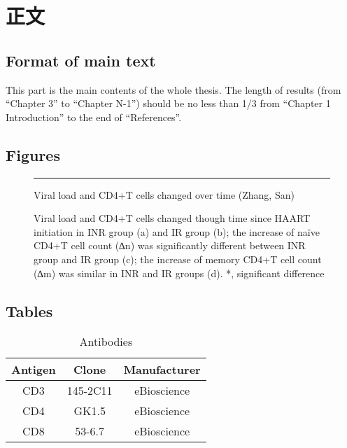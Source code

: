 \documentclass[degree=doctor]{thuthesis}
\begin{document}
\START
\showoutput

\mainmatter

\chapter{正文}

\section{Format of main text}

This part is the main contents of the whole thesis. The length of results (from “Chapter 3” to “Chapter N-1”) should be no less than 1/3 from “Chapter 1 Introduction” to the end of ``References''.


\section{Figures}

\begin{figure}[htb]
  \centering
  \rule{1cm}{1cm}
  \caption{Viral load and CD4+T cells changed over time (Zhang, San)}

  \caption*{Viral load and CD4+T cells changed though time since HAART initiation in INR group (a) and IR group (b); the increase of naïve CD4+T cell count (∆n) was significantly different between INR group and IR group (c); the increase of memory CD4+T cell count (∆m) was similar in INR and IR groups (d). *, significant difference}
\end{figure}


\section{Tables}

\begin{table}[htb]
  \centering
  \caption{Antibodies}
  \begin{tabular}{ccc}
    \toprule
    Antigen & Clone    & Manufacturer \\
    \midrule
    CD3     & 145-2C11 & eBioscience \\
    CD4     & GK1.5    & eBioscience \\
    CD8     & 53-6.7   & eBioscience \\
    \bottomrule
  \end{tabular}
\end{table}


\clearpage
\OMIT
\end{document}
